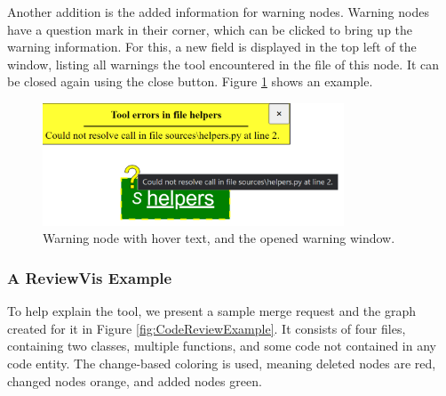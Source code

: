 \documentclass[a4paper,11pt,twoside]{article}
\theoremstyle{definition} %
\begin{document}
Another addition is the added information for warning nodes. Warning nodes have a question mark in their corner, which can be clicked to bring up the warning information. For this, a new field is displayed in the top left of the window, listing all warnings the tool encountered in the file of this node. It can be closed again using the close button. Figure \ref{fig:WarningWindow} shows an example.

\begin{figure}[h]
    \centering
    \includegraphics[width=0.8\textwidth]{Subfigures/warnings_window.PNG}
    \caption{Warning node with hover text, and the opened warning window.}
    \label{fig:WarningWindow}
\end{figure}


\subsubsection{A ReviewVis Example} \label{SubSubSec:ReviewVisExample}

To help explain the tool, we present a sample merge request and the graph created for it in Figure \ref{fig:CodeReviewExample}. It consists of four files, containing two classes, multiple functions, and some code not contained in any code entity. The change-based coloring is used, meaning deleted nodes are red, changed nodes orange, and added nodes green.
\end{document}

